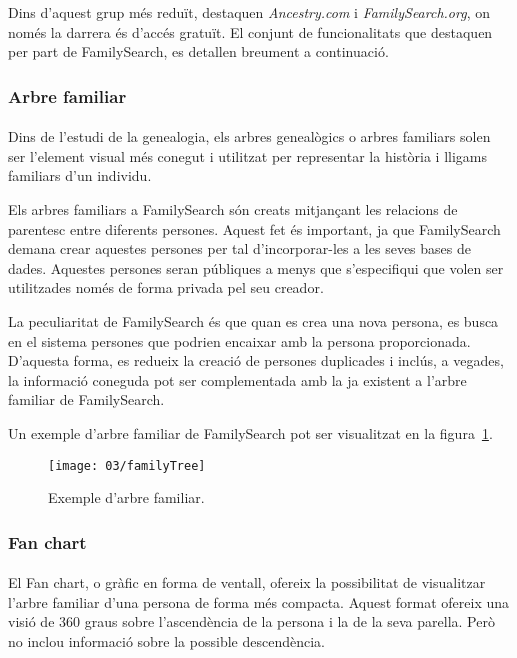     Dins d’aquest grup més reduït, destaquen \emph{Ancestry.com} i \emph{FamilySearch.org}, on només la darrera és d’accés gratuït. El conjunt de funcionalitats que destaquen per part de FamilySearch, es detallen breument a continuació.


    \subsubsection{Arbre familiar}

    \paragraph{}
    Dins de l’estudi de la genealogia, els arbres genealògics o arbres familiars solen ser l’element visual més conegut i utilitzat per representar la història i lligams familiars d'un individu.

    Els arbres familiars a FamilySearch són creats mitjançant les relacions de pa\-ren\-tesc entre diferents persones. Aquest fet és important, ja que FamilySearch demana crear aquestes persones per tal d'incorporar-les a les seves bases de dades. Aquestes persones seran públiques a menys que s'especifiqui que volen ser utilitzades només de forma privada pel seu creador.

    La peculiaritat de FamilySearch és que quan es crea una nova persona, es busca en el sistema persones que podrien encaixar amb la persona proporcionada. D'aquesta forma, es redueix la creació de persones duplicades i inclús, a vegades, la informació coneguda pot ser complementada amb la ja existent a l'arbre familiar de FamilySearch.

    Un exemple d'arbre familiar de FamilySearch  pot ser visualitzat en la figura~\ref{fig:familyTree}.

    \begin{figure}[h]
        \texttt{[image: 03/familyTree]}
        \centering
        \caption{Exemple d'arbre familiar.\label{fig:familyTree}}
    \end{figure}


    \subsubsection{Fan chart}

    \paragraph{}
    El Fan chart, o gràfic en forma de ventall, ofereix la possibilitat de visualitzar l'arbre familiar d'una persona de forma més compacta. Aquest format ofereix una visió de 360 graus sobre l'ascendència de la persona i la de la seva parella. Però no inclou informació sobre la possible descendència.

